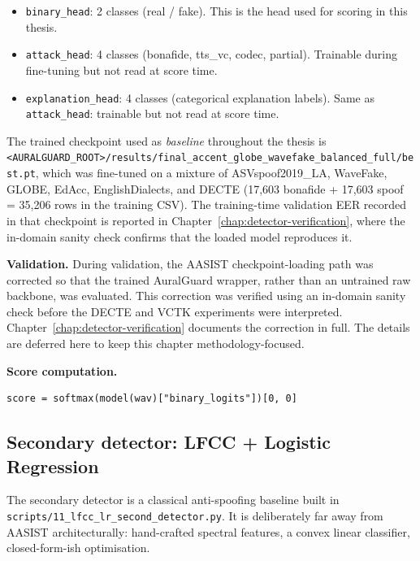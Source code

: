 \begin{itemize}
    \item \texttt{binary\_head}: 2 classes (real / fake). This is the head used for
        scoring in this thesis.
    \item \texttt{attack\_head}: 4 classes (bonafide, tts\_vc, codec, partial).
        Trainable during fine-tuning but not read at score time.
    \item \texttt{explanation\_head}: 4 classes (categorical explanation labels).
        Same as \texttt{attack\_head}: trainable but not read at score time.
\end{itemize}

The trained checkpoint used as \emph{baseline} throughout the thesis
is \texttt{<AURALGUARD\_ROOT>/}\allowbreak\texttt{results/}\allowbreak\texttt{final\_accent\_globe\_wavefake\_balanced\_full/}\allowbreak\texttt{best.pt},
which was fine-tuned on a mixture of ASVspoof2019\_LA, WaveFake,
GLOBE, EdAcc, EnglishDialects, and DECTE (17,603 bonafide + 17,603
spoof = 35,206 rows in the training CSV). The training-time
validation EER recorded in that checkpoint is reported in
Chapter~\ref{chap:detector-verification}, where the in-domain
sanity check confirms that the loaded model reproduces it.

\textbf{Validation.} During validation, the AASIST checkpoint-loading
path was corrected so that the trained AuralGuard wrapper, rather
than an untrained raw backbone, was evaluated. This correction was
verified using an in-domain sanity check before the DECTE and VCTK
experiments were interpreted.
Chapter~\ref{chap:detector-verification} documents the correction
in full. The details are deferred here to keep this chapter
methodology-focused.

\textbf{Score computation.}

\begin{verbatim}
score = softmax(model(wav)["binary_logits"])[0, 0]
\end{verbatim}

\subsection{Secondary detector: LFCC + Logistic Regression}
\label{sec:methodology-detectors-lfcc-lr}

The secondary detector is a classical anti-spoofing baseline built
in \texttt{scripts/11\_lfcc\_lr\_second\_detector.py}. It is
deliberately far away from AASIST architecturally: hand-crafted
spectral features, a convex linear classifier, closed-form-ish
optimisation.


